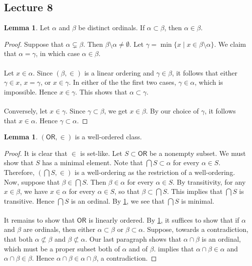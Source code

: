 \documentclass[10pt,letterpaper,cm]{nupset}
\theoremstyle{definition}
\theoremstyle{theorem}
\newtheorem{lemma}[definition]{Lemma}
\theoremstyle{remark}
\newcommand{\1}{\mathbf{1}}
\newcommand{\0}{\vec 0}
\newcommand{\ord}{\mathsf{OR}}
\begin{document}
\subsection{Lecture 8}

\begin{lemma}\label{alt-def}
Let $\alpha$ and $\beta$ be distinct ordinals. If $\alpha \subset \beta$, then $\alpha \in \beta$.
\end{lemma}
\begin{proof}
Suppose that $\alpha \subsetneq \beta$. Then $\beta \setminus \alpha \ne \emptyset$. Let $\gamma = \min\{x \mid x \in \beta \setminus \alpha\}$. We claim that $\alpha = \gamma$, in which case $\alpha \in \beta$. 
\\ \\Let $x \in \alpha$. Since $(\beta, \in)$ is a linear ordering and $\gamma \in \beta$, it follows that either $\gamma \in x$, $x= \gamma$, or $x \in \gamma$. In either of the the first two cases, $\gamma \in \alpha$, which is impossible. Hence $x \in \gamma$. This shows that $\alpha \subset \gamma$.  
\\ \\ Conversely, let $x \in \gamma$. Since $\gamma \subset \beta$, we get $x \in \beta$. By our choice of $\gamma$, it follows that $x \in \alpha$. Hence $\gamma \subset \alpha$.
\end{proof}

\begin{lemma} \label{ord-wo}
$(\ord, \in)$ is a well-ordered class.
\end{lemma}
\begin{proof}
It is clear that $\in$ is set-like. Let $S \subset \ord$ be a nonempty subset. We must show that $S$ has a minimal element. Note that $\bigcap{S} \subset \alpha$ for every $\alpha \in S$. Therefore, $\left(\bigcap{S}, \in\right)$ is a  well-ordering as the restriction of a well-ordering. Now, suppose that $\beta \in \bigcap{S}$. Then $\beta \in \alpha$ for every $\alpha \in S$. By transitivity, for any $x\in \beta$, we have  $x \in \alpha$ for every $\alpha \in S$, so that $\beta \subset \bigcap{S}$. This implies that $\bigcap{S}$ is transitive. Hence $\bigcap{S}$ is an ordinal. By \cref{alt-def}, we see that $\bigcap{S}$ is minimal. 
\\ \\
It remains to show that $\ord$ is linearly ordered. By \cref{alt-def}, it suffices to show that if $\alpha$ and $\beta$ are ordinals, then either $\alpha \subset \beta$ or $\beta \subset \alpha$. Suppose, towards a contradiction, that  both $\alpha \not \subset \beta$ and $\beta \not \subset \alpha$. Our last paragraph shows that $\alpha \cap \beta$ is an ordinal, which must be a proper subset both of $\alpha$ and of $\beta$.  implies that $\alpha \cap \beta \in \alpha$ and $\alpha \cap \beta \in \beta$. Hence $\alpha \cap \beta \in \alpha \cap \beta$, a contradiction. 
\end{proof}
\end{document}
